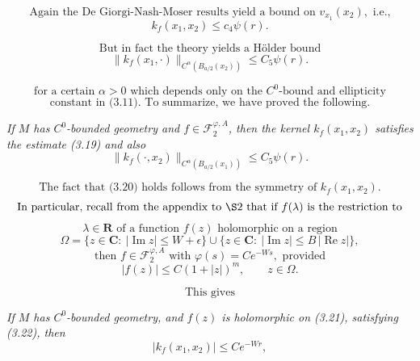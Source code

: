 \[
\text{Again the De Giorgi-Nash-Moser results yield a bound on }v_{x_1}(x_2),\text{ i.e.,}
\]
\begin{equation}\tag{3.18}
 k_f(x_1,x_2)\le c_4\psi(r).
\end{equation}

\[
\text{But in fact the theory yields a Hölder bound}
\]
\begin{equation}\tag{3.19}
 \bigl\|k_f(x_1,\cdot)\bigr\|_{C^\alpha(B_{a/2}(x_2))}\le C_5\psi(r).
\end{equation}

\[
\text{for a certain }\alpha>0\text{ which depends only on the }C^0\text{-bound and ellipticity}
\]
\[
\text{constant in (3.11). To summarize, we have proved the following.}
\]

\begin{theorem}
\label{thm:c0-bounded-geometry-kernel-estimates}
\textit{If $M$ has $C^0$-bounded geometry and $f\in \mathcal{F}_2^{\varphi,A}$, then the kernel $k_f(x_1,x_2)$ satisfies the estimate (3.19) and also}
\begin{equation}\tag{3.20}
 \bigl\|k_f(\cdot,x_2)\bigr\|_{C^\alpha(B_{a/2}(x_1))}\le C_5\psi(r).
\end{equation}
\end{theorem}

\[
\text{The fact that (3.20) holds follows from the symmetry of }k_f(x_1,x_2).
\]
\[
\text{In particular, recall from the appendix to \S2 that if }f(\lambda)\text{ is the restriction to}
\]
\[
\lambda\in\mathbf{R}\text{ of a function }f(z)\text{ holomorphic on a region}
\]
\begin{equation}\tag{3.21}
 \Omega=\{z\in \mathbf{C}:\ |\operatorname{Im}z|\le W+\epsilon\}\cup\{z\in \mathbf{C}:\ |\operatorname{Im}z|\le B\,|\operatorname{Re}z|\},
\end{equation}
\[
\text{then }f\in \mathcal{F}_2^{\varphi,A}\text{ with }\varphi(s)=Ce^{-Ws},\text{ provided}
\]
\begin{equation}\tag{3.22}
 |f(z)|\le C(1+|z|)^m,\qquad z\in\Omega.
\end{equation}

\[
\text{This gives}
\]

\begin{corollary}
\label{cor:c0-bounded-geometry-exponential-decay}
\textit{If $M$ has $C^0$-bounded geometry, and $f(z)$ is holomorphic on (3.21), satisfying (3.22), then}
\begin{equation}\tag{3.23}
 |k_f(x_1,x_2)|\le Ce^{-Wr},
\end{equation}
\end{corollary}

